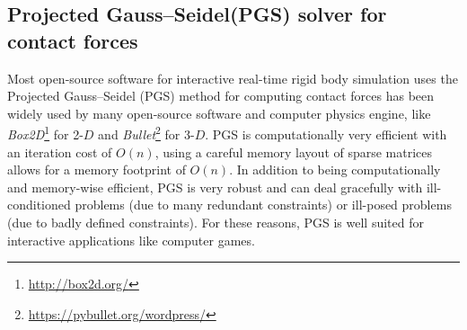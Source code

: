     \subsection{Projected Gauss–Seidel(PGS) solver for contact forces}
    Most open-source software for interactive real-time rigid body simulation uses the Projected Gauss–Seidel (PGS) method for computing contact forces has been widely used by many open-source software and computer physics engine, like \textit{Box2D}\footnote{\url{http://box2d.org/}} for 2-$D$ and \textit{Bullet}\footnote{\url{https://pybullet.org/wordpress/}} for 3-$D$. PGS is computationally very efficient with an iteration cost of $O(n)$, using a careful memory layout of sparse matrices allows for a memory footprint of $O(n)$. In addition to being computationally and memory-wise efficient, PGS is very robust and can deal gracefully with ill-conditioned problems (due to many redundant constraints) or ill-posed problems (due to badly defined constraints). For these reasons, PGS is well suited for interactive applications like computer games. \\



      